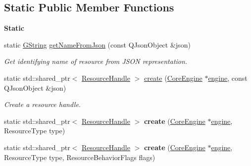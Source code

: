 \subsection*{Static Public Member Functions}
\begin{Indent}\textbf{ Static}\par
\begin{DoxyCompactItemize}
\item 
\mbox{\label{classrev_1_1_resource_handle_aa8e5f147e2bd4705021156257569ae32}} 
static \mbox{\hyperlink{classrev_1_1_g_string}{G\+String}} \mbox{\hyperlink{classrev_1_1_resource_handle_aa8e5f147e2bd4705021156257569ae32}{get\+Name\+From\+Json}} (const Q\+Json\+Object \&json)
\begin{DoxyCompactList}\small\item\em Get identifying name of resource from J\+S\+ON representation. \end{DoxyCompactList}\item 
\mbox{\label{classrev_1_1_resource_handle_ad75ee094fcfb181f563f58b6b1b16ab0}} 
static std\+::shared\+\_\+ptr$<$ \mbox{\hyperlink{classrev_1_1_resource_handle}{Resource\+Handle}} $>$ \mbox{\hyperlink{classrev_1_1_resource_handle_ad75ee094fcfb181f563f58b6b1b16ab0}{create}} (\mbox{\hyperlink{classrev_1_1_core_engine}{Core\+Engine}} $\ast$\mbox{\hyperlink{classrev_1_1_resource_handle_a720422f2150ec9eec2b3984953a13ef8}{engine}}, const Q\+Json\+Object \&json)
\begin{DoxyCompactList}\small\item\em Create a resource handle. \end{DoxyCompactList}\item 
\mbox{\label{classrev_1_1_resource_handle_a3fabe53b3d06bde674411388d0b5a38d}} 
static std\+::shared\+\_\+ptr$<$ \mbox{\hyperlink{classrev_1_1_resource_handle}{Resource\+Handle}} $>$ {\bfseries create} (\mbox{\hyperlink{classrev_1_1_core_engine}{Core\+Engine}} $\ast$\mbox{\hyperlink{classrev_1_1_resource_handle_a720422f2150ec9eec2b3984953a13ef8}{engine}}, Resource\+Type type)
\item 
\mbox{\label{classrev_1_1_resource_handle_abad6c60e752be98e5300dcabe8205558}} 
static std\+::shared\+\_\+ptr$<$ \mbox{\hyperlink{classrev_1_1_resource_handle}{Resource\+Handle}} $>$ {\bfseries create} (\mbox{\hyperlink{classrev_1_1_core_engine}{Core\+Engine}} $\ast$\mbox{\hyperlink{classrev_1_1_resource_handle_a720422f2150ec9eec2b3984953a13ef8}{engine}}, Resource\+Type type, Resource\+Behavior\+Flags flags)

\end{DoxyCompactItemize}
\end{Indent}
